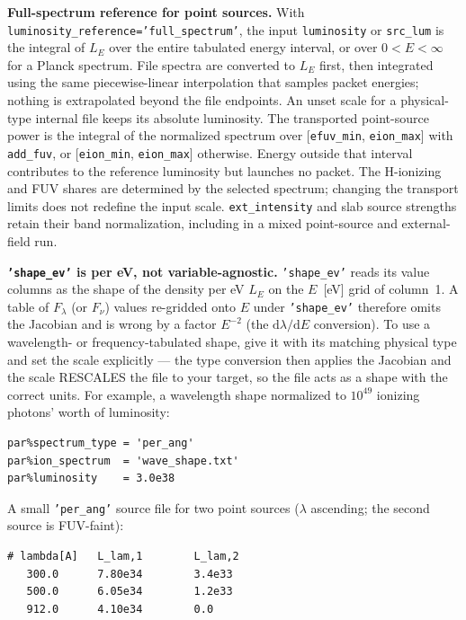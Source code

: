 \documentclass[english,a4paper]{my_memo}
\newcommand{\code}[1]{\texttt{#1}}
\begin{document}
\medskip\noindent\textbf{Full-spectrum reference for point sources.}
With \code{luminosity\_reference='full\_spectrum'}, the input
\code{luminosity} or \code{src\_lum} is the integral of $L_E$ over the
entire tabulated energy interval, or over $0<E<\infty$ for a Planck
spectrum.  File spectra are converted to $L_E$ first, then integrated
using the same piecewise-linear interpolation that samples packet
energies; nothing is extrapolated beyond the file endpoints.  An unset
scale for a physical-type internal file keeps its absolute luminosity.
The transported point-source power is the integral of the normalized
spectrum over [\code{efuv\_min}, \code{eion\_max}] with \code{add\_fuv},
or [\code{eion\_min}, \code{eion\_max}] otherwise.  Energy outside that
interval contributes to the reference luminosity but launches no packet.
The H-ionizing and FUV shares are determined by the selected spectrum;
changing the transport limits does not redefine the input scale.
\code{ext\_intensity} and slab source strengths retain their band
normalization, including in a mixed point-source and external-field run.

\medskip\noindent\textbf{\code{'shape\_ev'} is per eV, not variable-agnostic.}
\code{'shape\_ev'} reads its value columns as the shape of the density per eV
$L_E$ on the $E$~[eV] grid of column~1.  A table of $F_\lambda$ (or
$F_\nu$) values re-gridded onto $E$ under \code{'shape\_ev'} therefore omits the
Jacobian and is wrong by a factor $E^{-2}$ (the $\mathrm{d}\lambda/\mathrm{d}E$
conversion).  To use a wavelength- or frequency-tabulated shape, give it
with its matching physical type and set the scale explicitly --- the type
conversion then applies the Jacobian and the scale RESCALES the file to
your target, so the file acts as a shape with the correct units.  For
example, a wavelength shape normalized to $10^{49}$ ionizing photons'
worth of luminosity:
\begin{center}\small
\begin{verbatim}
par%spectrum_type = 'per_ang'
par%ion_spectrum  = 'wave_shape.txt'
par%luminosity    = 3.0e38
\end{verbatim}
\end{center}

\medskip\noindent A small \code{'per\_ang'} source file for two point
sources ($\lambda$ ascending; the second source is FUV-faint):
\begin{center}\small
\begin{verbatim}
# lambda[A]   L_lam,1        L_lam,2
   300.0      7.80e34        3.4e33
   500.0      6.05e34        1.2e33
   912.0      4.10e34        0.0
\end{verbatim}
\end{center}
\end{document}
